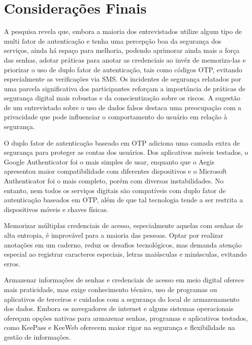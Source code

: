 \documentclass[12pt]{article}
\begin{document}
\section{Considerações Finais}


A pesquisa revela que, embora a maioria dos entrevistados utilize algum tipo de multi fator
de autenticação e tenha uma percepção boa da segurança dos serviços, ainda há espaço para
melhoria, podendo aprimorar ainda mais a força das senhas, adotar práticas para anotar as
credenciais ao invéz de memoriza-las e priorizar o uso de duplo fator de autenticação, tais
como códigos OTP, evitando especialmente as verificações via SMS.
Os incidentes de segurança relatados por uma parcela significativa dos participantes
reforçam a importância de práticas de segurança digital mais robustas e da
conscientização sobre os riscos.
A sugestão de um entrevistado sobre o uso de dados falsos destaca uma preocupação
com a privacidade que pode influenciar o comportamento do usuário em relação à
segurança.


O duplo fator de autenticação baseado em OTP adiciona uma camada extra de segurança
para proteger as contas dos usuários.
Dos aplicativos móveis testados, o Google Authenticator foi o mais simples de usar,
enquanto que o Aegis apresentou maior compatibilidade com diferentes dispositivos e
o Microsoft Authenticator foi o mais completo, porém com diversas instabilidades.
No entanto, nem todos os serviços digitais são compatíveis com duplo fator de
autenticação baseados em OTP, além de que tal tecnologia tende a ser restrita a
dispositivos móveis e chaves físicas.

Memorizar múltiplas credenciais de acesso, especialmente aquelas com senhas de alta
entropia, é improvável para a maioria das pessoas.
Optar por realizar anotações em um caderno, reduz os desafios tecnológicos, mas
demanda atenção especial ao registrar caracteres especiais, letras maiúsculas e
minúsculas, evitando erros.

Armazenar informações de senhas e credenciais de acesso em meio digital oferece mais
praticidade, mas exige conhecimento técnico, uso de programas ou aplicativos de
terceiros e cuidados com a segurança do local de armazenamento dos dados.
Embora os navegadores de internet e alguns sistemas operacionais ofereçam opções
nativas para armazenar senhas, programas e aplicativos testados, como KeePass e KeeWeb
oferecem maior rigor na segurança e flexibilidade na gestão de informações.
\end{document}
